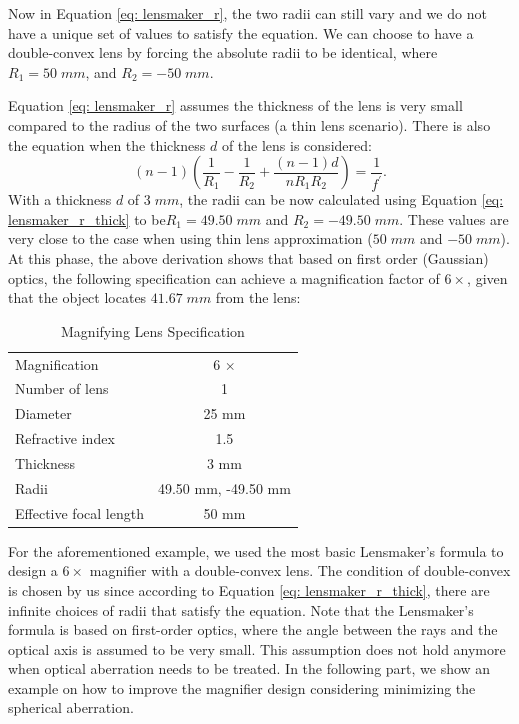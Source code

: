 Now in Equation \ref{eq: lensmaker_r}, the two radii can still vary and we do not have a unique set of values to satisfy the equation. We can choose to have a double-convex lens by forcing the absolute radii to be identical, where $R_1 = 50 \; mm$, and $R_2 = -50 \; mm$. 

Equation \ref{eq: lensmaker_r} assumes the thickness of the lens is very small compared to the radius of the two surfaces (a thin lens scenario). There is also the equation when the thickness $d$ of the lens is considered:
\begin{equation} \label{eq: lensmaker_r_thick}
    (n-1)\left( \frac{1}{R_1} - \frac{1}{R_2} + \frac{(n-1)d}{nR_1R_2} \right) = \frac{1}{f^\prime}  .
\end{equation}
With a thickness $d$ of $3 \; mm$, the radii can be now calculated using Equation \ref{eq: lensmaker_r_thick} to be$R_1 =  49.50 \; mm$ and $R_2 = -49.50 \; mm$. These values are very close to the case when using thin lens approximation ($50 \; mm$ and $-50 \; mm$). 
At this phase, the above derivation shows that based on first order (Gaussian) optics, the following specification can achieve a magnification factor of $6\times$, given that the object locates $41.67 \; mm$ from the lens:

\begin{table}[h!]
    \centering
    \captionsetup{justification=centering}
    \caption{Magnifying Lens Specification}
    \label{magnifying lens specs}
    \vspace{-1em}
    \begin{tabular}{ p{15em}  c }
    \hline 
    Magnification & 6 $\times$\\ 
    Number of lens & 1\\ 
    Diameter & 25 mm\\ 
    Refractive index & 1.5\\ 
    Thickness & 3 mm\\ 
    Radii & 49.50 mm, -49.50 mm\\
    Effective focal length & 50 mm\\
    \hline
    \end{tabular}
\end{table}
 
For the aforementioned example, we used the most basic Lensmaker's formula to design a $6 \times$ magnifier with a double-convex lens.  The condition of double-convex is chosen by us since according to Equation \ref{eq: lensmaker_r_thick}, there are infinite choices of radii that satisfy the equation. Note that the Lensmaker's formula is based on first-order optics, where the angle between the rays and the optical axis is assumed to be very small. This assumption does not hold anymore when optical aberration needs to be treated. In the following part, we show an example on how to improve the magnifier design considering minimizing the spherical aberration.  

